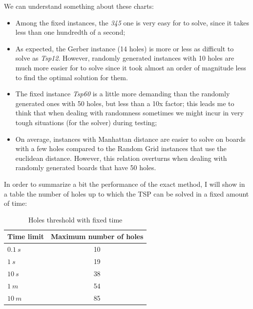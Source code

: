 We can understand something about these charts:

\begin{itemize}
  \item Among the fixed instances, the \textit{345} one is very easy for
    \cplex{} to solve, since it takes less than one hundredth of a second;
  \item As expected, the Gerber instance (14 holes) is more or less as
    difficult to solve as \textit{Tsp12}. However, randomly generated
    instances with 10 holes are much more easier for \cplex{} to solve since
    it took almost an order of magnitude less to find the optimal solution for
    them.
  \item The fixed instance \textit{Tsp60} is a little more demanding than the
    randomly generated ones with 50 holes, but less than a 10x factor; this
    leads me to think that when dealing with randomness sometimes we might
    incur in very tough situations (for the solver) during testing;
  \item On average, instances with Manhattan distance are easier to solve on
    boards with a few holes compared to the Random Grid instances that use the
    euclidean distance. However, this relation overturns when dealing with
    randomly generated boards that have 50 holes.
\end{itemize}

In order to summarize a bit the performance of the exact method, I will show
in a table the number of holes up to which the TSP can be solved in a fixed
amount of time:

\begin{table}[H]
  \centering
  \begin{tabular}{|l|c|}
    \hline
    \textbf{Time limit} & \textbf{Maximum number of holes} \\
    \hline
    \hline
    $0.1\ s$ & 10 \\
    \hline
    $1\ s$ & 19 \\
    \hline
    $10\ s$ & 38 \\
    \hline
    $1\ m$ & 54 \\
    \hline
    $10\ m$ & 85 \\
    \hline
  \end{tabular}
  \caption{Holes threshold with fixed time}
  \label{tab:stress-cplex}
\end{table}
